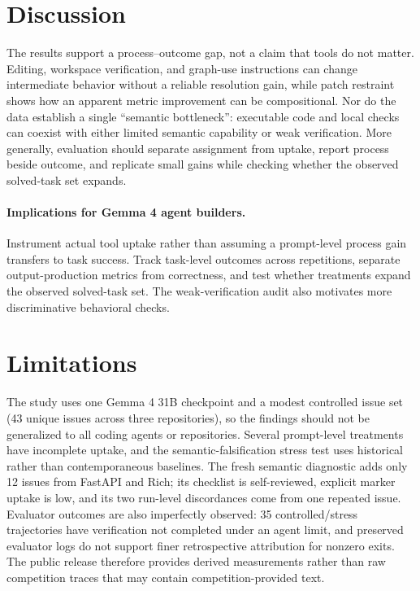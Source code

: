 \documentclass[10pt,twocolumn]{article}
\begin{document}
\section{Discussion}
The results support a process--outcome gap, not a claim that tools do not matter. Editing, workspace verification, and graph-use instructions can change intermediate behavior without a reliable resolution gain, while patch restraint shows how an apparent metric improvement can be compositional. Nor do the data establish a single ``semantic bottleneck'': executable code and local checks can coexist with either limited semantic capability or weak verification. More generally, evaluation should separate assignment from uptake, report process beside outcome, and replicate small gains while checking whether the observed solved-task set expands.

\vspace{-0.35em}\paragraph{Implications for Gemma 4 agent builders.} Instrument actual tool uptake rather than assuming a prompt-level process gain transfers to task success. Track task-level outcomes across repetitions, separate output-production metrics from correctness, and test whether treatments expand the observed solved-task set. The weak-verification audit also motivates more discriminative behavioral checks.

\vspace{-0.55em}\section{Limitations}
The study uses one Gemma 4 31B checkpoint and a modest controlled issue set (43 unique issues across three repositories), so the findings should not be generalized to all coding agents or repositories. Several prompt-level treatments have incomplete uptake, and the semantic-falsification stress test uses historical rather than contemporaneous baselines. The fresh semantic diagnostic adds only 12 issues from FastAPI and Rich; its checklist is self-reviewed, explicit marker uptake is low, and its two run-level discordances come from one repeated issue. Evaluator outcomes are also imperfectly observed: 35 controlled/stress trajectories have verification not completed under an agent limit, and preserved evaluator logs do not support finer retrospective attribution for nonzero exits. The public release therefore provides derived measurements rather than raw competition traces that may contain competition-provided text.
\end{document}
